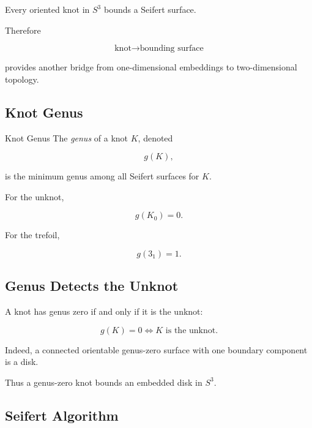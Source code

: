 Every oriented knot in \(S^3\) bounds a Seifert surface.

Therefore

\[
\boxed{
\text{knot}
\longrightarrow
\text{bounding surface}
}
\]

provides another bridge from one-dimensional embeddings to
two-dimensional topology.

\subsection{Knot Genus}
\label{subsec:knot-genus}

\begin{definitionbox}{Knot Genus}
The \emph{genus} of a knot \(K\), denoted

\[
\boxed{
g(K),
}
\]

is the minimum genus among all Seifert surfaces for \(K\).
\end{definitionbox}

For the unknot,

\[
\boxed{
g(K_0)=0.
}
\]

For the trefoil,

\[
\boxed{
g(3_1)=1.
}
\]

\subsection{Genus Detects the Unknot}
\label{subsec:genus-detects-unknot}

A knot has genus zero if and only if it is the unknot:

\[
\boxed{
g(K)=0
\Longleftrightarrow
K\text{ is the unknot}.
}
\]

Indeed, a connected orientable genus-zero surface with one boundary
component is a disk.

Thus a genus-zero knot bounds an embedded disk in \(S^3\).

\subsection{Seifert Algorithm}
\label{subsec:seifert-algorithm}

